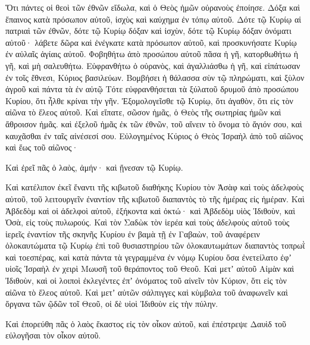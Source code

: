 {Ὅτι πάντες οἱ θεοὶ τῶν ἐθνῶν εἴδωλα, καὶ ὁ Θεὸς ἡμῶν οὐρανοὺς ἐποίησε.
Δόξα καὶ ἔπαινος κατὰ πρόσωπον αὐτοῦ, ἰσχὺς καὶ καύχημα ἐν τόπῳ αὐτοῦ.
Δότε τῷ Κυρίῳ αἱ πατριαὶ τῶν ἐθνῶν, δότε τῷ Κυρίῳ δόξαν καὶ ἰσχὺν,
δότε τῷ Κυρίῳ δόξαν ὀνόματι αὐτοῦ· λάβετε δῶρα καὶ ἐνέγκατε κατὰ πρόσωπον αὐτοῦ, καὶ προσκυνήσατε Κυρίῳ ἐν αὐλαῖς ἁγίαις αὐτοῦ.
Φοβηθήτω ἀπὸ προσώπου αὐτοῦ πᾶσα ἡ γῆ, κατορθωθήτω ἡ γῆ, καὶ μὴ σαλευθήτω.
Εὐφρανθήτω ὁ οὐρανὸς, καὶ ἀγαλλιάσθω ἡ γῆ, καὶ εἰπάτωσαν ἐν τοῖς ἔθνεσι, Κύριος βασιλεύων.
Βομβήσει ἡ θάλασσα σὺν τῷ πληρώματι, καὶ ξὺλον ἀγροῦ καὶ πάντα τὰ ἐν αὐτῷ
Τότε εὐφρανθήσεται τὰ ξύλατοῦ δρυμοῦ ἀπὸ προσώπου Κυρίου, ὅτι ἦλθε κρίναι τὴν γῆν.
Ἐξομολογεῖσθε τῷ Κυρίῳ, ὅτι ἀγαθὸν, ὅτι εἰς τὸν αἰῶνα τὸ ἔλεος αὐτοῦ.
Καὶ εἴπατε, σῶσον ἡμᾶς, ὁ Θεὸς τῆς σωτηρίας ἡμῶν καὶ ἄθροισον ἡμᾶς. καὶ ἐξελοῦ ἡμᾶς ἐκ τῶν ἐθνῶν, τοῦ αἴνειν τὸ ὄνομα τὸ ἅγιόν σου, καὶ καυχᾶσθαι ἐν ταῖς αἰνέσεσί σου.
Εὐλογημένος Κύριος ὁ Θεὸς Ἰσραὴλ ἀπὸ τοῦ αἰῶνος καὶ ἕως τοῦ αἰῶνος·
\par }{\PP Καὶ ἐρεῖ πᾶς ὁ λαὸς, ἀμήν· καὶ ᾔνεσαν τῷ Κυρίῳ.
\par }{\PP {}Καὶ κατέλιπον ἐκεῖ ἔναντι τῆς κιβωτοῦ διαθήκης Κυρίου τὸν Ἀσὰφ καὶ τοὺς ἀδελφοὺς αὐτοῦ, τοῦ λειτουργεῖν ἐναντίον τῆς κιβωτοῦ διαπαντὸς τὸ τῆς ἡμέρας εἰς ἡμέραν.
Καὶ Ἀβδεδὸμ καὶ οἱ ἀδελφοὶ αὐτοῦ, ἑξήκοντα καὶ ὀκτώ· καὶ Ἀβδεδὸμ υἱὸς Ἰδιθοὺν, καὶ Ὀσὰ, εἰς τοὺς πυλωρούς.
Καὶ τὸν Σαδὼκ τὸν ἱερέα καὶ τοὺς ἀδελφοὺς αὐτοῦ τοὺς ἱερεῖς ἐναντίον τῆς σκηνῆς Κυρίου ἐν βαμὰ τῇ ἐν Γαβαὼν,
τοῦ ἀναφέρειν ὁλοκαυτώματα τῷ Κυρίῳ ἐπὶ τοῦ θυσιαστηρίου τῶν ὁλοκαυτωμάτων διαπαντὸς τοπρωῒ καὶ τοεσπέρας, καὶ κατὰ πάντα τὰ γεγραμμένα ἐν νόμῳ Κυρίου ὅσα ἐνετείλατο ἐφʼ υἱοῖς Ἰσραὴλ ἐν χειρὶ Μωυσῆ τοῦ θεράποντος τοῦ Θεοῦ.
Καὶ μετʼ αὐτοῦ Αἰμὰν καὶ Ἰδιθοὺν, καὶ οἱ λοιποὶ ἐκλεγέντες ἐπʼ ὀνόματος τοῦ αἰνεῖν τὸν Κύριον, ὅτι εἰς τὸν αἰῶνα τὸ ἔλεος αὐτοῦ.
Καὶ μετʼ αὐτῶν σάλπιγγες καὶ κὺμβαλα τοῦ ἀναφωνεῖν καὶ ὄργανα τῶν ῷδῶν τοῖ Θεοῦ, οἱ δὲ υἱοὶ Ἰδιθοὺν εἰς τὴν πύλην.
\par }{\PP {}Καὶ ἐπορεύθη πᾶς ὁ λαὸς ἕκαστος εἰς τὸν οἶκον αὐτοῦ, καὶ ἐπέστρεψε Δαυὶδ τοῦ εὐλογῆσαι τὸν οἶκον αὐτοῦ.

}
